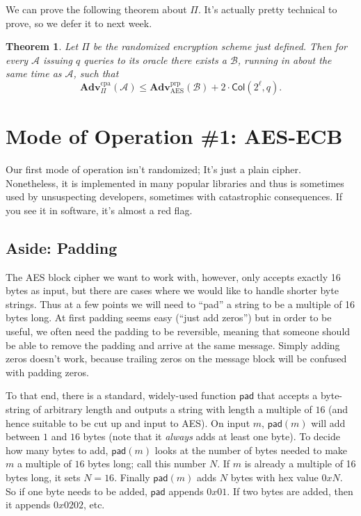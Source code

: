 \documentclass[11pt]{article}
\newtheorem{theorem}{Theorem}
\newcommand{\msgs}{\mathcal{M}}
\newcommand{\ctxts}{\mathcal{C}}
\newcommand{\keys}{\mathcal{K}}
\newcommand{\rands}{\mathcal{R}}
\newcommand{\Enc}{\mathsf{Enc}}
\newcommand{\Dec}{\mathsf{Dec}}
\newcommand{\calA}{\mathcal{A}}
\newcommand{\calB}{\mathcal{B}}
\newcommand{\Adv}{\mathbf{Adv}}
\newcommand{\AdvPRP}[2]{\Adv^{\mathrm{prp}}_{#1}({#2})}
\newcommand{\AdvCPA}[2]{\Adv^{\mathrm{cpa}}_{#1}({#2})}
\newcommand{\bits}{\{0,1\}}
\newcommand{\aes}{\mathrm{AES}}
\newcommand{\pad}{\mathsf{pad}}
\newcommand{\Col}{\mathsf{Col}}
\begin{document}
We can prove the following theorem about $\Pi$. It's actually pretty technical
to prove, so we defer it to next week. 
\begin{theorem}
    Let $\Pi$ be the randomized encryption scheme just defined.
    Then for every $\calA$ issuing $q$
    queries to its oracle there exists a $\calB$, running in about the same
    time as $\calA$, such that
    \[
        \AdvCPA{\Pi}{\calA} \leq \AdvPRP{\aes}{\calB} + 2\cdot \Col(2^\ell,q).
    \]
\end{theorem}


\section{Mode of Operation \#1: AES-ECB}

Our first mode of operation isn't randomized; It's just a plain cipher.
Nonetheless, it is implemented in many popular libraries and thus is sometimes
used by unsuspecting developers, sometimes with catastrophic consequences.
If you see it in software, it's almost a red flag.

\subsection{Aside: Padding}

The AES block cipher we want to work with, however, only accepts exactly 16
bytes as input, but there are cases where we would like to handle shorter byte
strings. Thus at a few points we will need to ``pad'' a string to be a multiple
of 16 bytes long.  At first padding seems easy (``just add zeros'') but in
order to be useful, we often need the padding to be reversible, meaning that
someone should be able to remove the padding and arrive at the same message.
Simply adding zeros doesn't work, because trailing zeros on the message block
will be confused with padding zeros.

To that end, there is a standard, widely-used function $\pad$ that accepts a
byte-string of arbitrary length and outputs a string with length a multiple of
$16$ (and hence suitable to be cut up and input to AES). On input $m$,
$\pad(m)$ will add between $1$ and $16$ bytes (note that it \emph{always} adds
at least one byte). To decide how many bytes to add, $\pad(m)$ looks at the
number of bytes needed to make $m$ a multiple of $16$ bytes long; call this
number $N$. If $m$ is already a multiple of 16 bytes long, it sets $N=16$.
Finally $\pad(m)$ adds $N$ bytes with hex value $0xN$.  So if one byte needs to
be added, $\pad$ appends $0x01$. If two bytes are added, then it appends
$0x0202$, etc.
\end{document}
